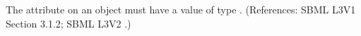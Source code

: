 The attribute  on an \Trigger object must
have a value of type .  (References: SBML L3V1 Section 3.1.2; SBML L3V2
.)
